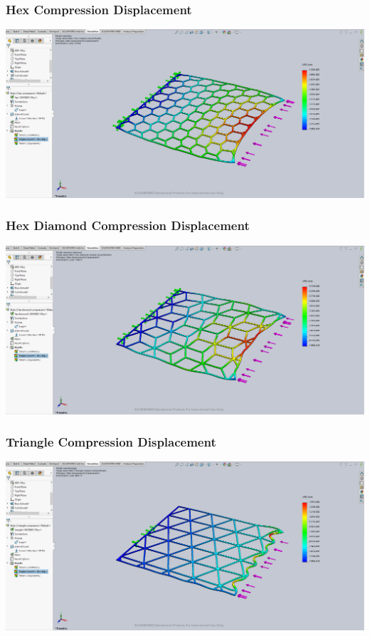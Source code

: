 \documentclass[12pt, letterpaper]{article}
\begin{document}
\begin{singlespace}
\subsubsection{Hex Compression Displacement}
\label{ap:h-c-d}
\includegraphics[width=0.8\linewidth]{./graphs/compression/hex-compression-displacement}

\subsubsection{Hex Diamond Compression Displacement}
\label{ap:hd-c-d}
\includegraphics[width=0.8\linewidth]{./graphs/compression/hex-diamond-compression-displacement}

\subsubsection{Triangle Compression Displacement}
\label{ap:t-c-d}
\includegraphics[width=0.8\linewidth]{./graphs/compression/triangle-compression-displacement}




\end{singlespace}
\end{document}
